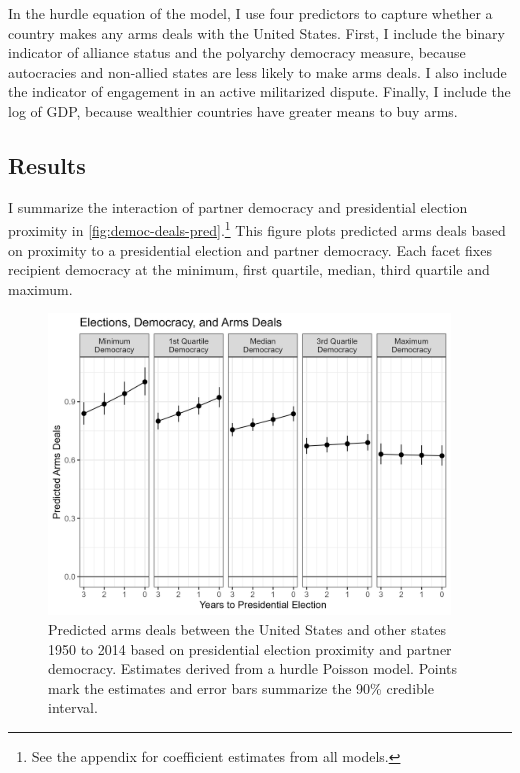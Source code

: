\documentclass[12pt]{article}
\begin{document}
In the hurdle equation of the model, I use four predictors to capture whether a country makes any arms deals with the United States. 
First, I include the binary indicator of alliance status and the polyarchy democracy measure, because autocracies and non-allied states are less likely to make arms deals. 
I also include the indicator of engagement in an active militarized dispute. 
Finally, I include the log of GDP, because wealthier countries have greater means to buy arms.


\subsection{Results}


I summarize the interaction of partner democracy and presidential election proximity in \autoref{fig:democ-deals-pred}.\footnote{See the appendix for coefficient estimates from all models.}
This figure plots predicted arms deals based on proximity to a presidential election and partner democracy.
Each facet fixes recipient democracy at the minimum, first quartile, median, third quartile and maximum.


\begin{figure}[htpb]
	\centering
		\includegraphics[width=0.95\textwidth]{../figures/democ-deals-pred.png}
	\caption{Predicted arms deals between the United States and other states 1950 to 2014 based on presidential election proximity and partner democracy. Estimates derived from a hurdle Poisson model. Points mark the estimates and error bars summarize the 90\% credible interval.}
	\label{fig:democ-deals-pred}
\end{figure}
\end{document}
